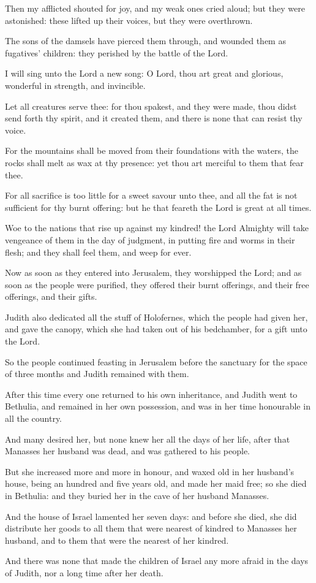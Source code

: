 {\par }{\PP {}Then my afflicted shouted for joy, and my weak ones cried aloud; but they were astonished: these lifted up their voices, but they were overthrown.
\par }{\PP {}The sons of the damsels have pierced them through, and wounded them as fugatives’ children: they perished by the battle of the Lord.
\par }{\PP {}I will sing unto the Lord a new song: O Lord, thou art great and glorious, wonderful in strength, and invincible.
\par }{\PP {}Let all creatures serve thee: for thou spakest, and they were made, thou didst send forth thy spirit, and it created them, and there is none that can resist thy voice.
\par }{\PP {}For the mountains shall be moved from their foundations with the waters, the rocks shall melt as wax at thy presence: yet thou art merciful to them that fear thee.
\par }{\PP {}For all sacrifice is too little for a sweet savour unto thee, and all the fat is not sufficient for thy burnt offering: but he that feareth the Lord is great at all times.
\par }{\PP {}Woe to the nations that rise up against my kindred! the Lord Almighty will take vengeance of them in the day of judgment, in putting fire and worms in their flesh; and they shall feel them, and weep for ever.
\par }{\PP {}Now as soon as they entered into Jerusalem, they worshipped the Lord; and as soon as the people were purified, they offered their burnt offerings, and their free offerings, and their gifts.
\par }{\PP {}Judith also dedicated all the stuff of Holofernes, which the people had given her, and gave the canopy, which she had taken out of his bedchamber, for a gift unto the Lord.
\par }{\PP {}So the people continued feasting in Jerusalem before the sanctuary for the space of three months and Judith remained with them.
\par }{\PP {}After this time every one returned to his own inheritance, and Judith went to Bethulia, and remained in her own possession, and was in her time honourable in all the country.
\par }{\PP {}And many desired her, but none knew her all the days of her life, after that Manasses her husband was dead, and was gathered to his people.
\par }{\PP {}But she increased more and more in honour, and waxed old in her husband’s house, being an hundred and five years old, and made her maid free; so she died in Bethulia: and they buried her in the cave of her husband Manasses.
\par }{\PP {}And the house of Israel lamented her seven days: and before she died, she did distribute her goods to all them that were nearest of kindred to Manasses her husband, and to them that were the nearest of her kindred.
\par }{\PP {}And there was none that made the children of Israel any more afraid in the days of Judith, nor a long time after her death.
\par }